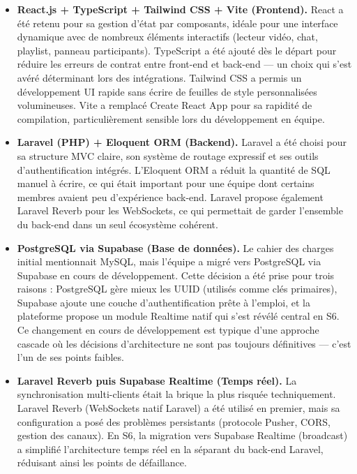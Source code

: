 \documentclass[11pt,a4paper]{report}
\begin{document}
\begin{itemize}
    \item \textbf{React.js + TypeScript + Tailwind CSS + Vite (Frontend).}
    React a été retenu pour sa gestion d'état par composants, idéale pour une interface dynamique avec de nombreux éléments interactifs (lecteur vidéo, chat, playlist, panneau participants). TypeScript a été ajouté dès le départ pour réduire les erreurs de contrat entre front-end et back-end --- un choix qui s'est avéré déterminant lors des intégrations. Tailwind CSS a permis un développement UI rapide sans écrire de feuilles de style personnalisées volumineuses. Vite a remplacé Create React App pour sa rapidité de compilation, particulièrement sensible lors du développement en équipe.

    \item \textbf{Laravel (PHP) + Eloquent ORM (Backend).}
    Laravel a été choisi pour sa structure MVC claire, son système de routage expressif et ses outils d'authentification intégrés. L'Eloquent ORM a réduit la quantité de SQL manuel à écrire, ce qui était important pour une équipe dont certains membres avaient peu d'expérience back-end. Laravel propose également Laravel Reverb pour les WebSockets, ce qui permettait de garder l'ensemble du back-end dans un seul écosystème cohérent.

    \item \textbf{PostgreSQL via Supabase (Base de données).}
    Le cahier des charges initial mentionnait MySQL, mais l'équipe a migré vers PostgreSQL via Supabase en cours de développement. Cette décision a été prise pour trois raisons : PostgreSQL gère mieux les UUID (utilisés comme clés primaires), Supabase ajoute une couche d'authentification prête à l'emploi, et la plateforme propose un module Realtime natif qui s'est révélé central en S6. Ce changement en cours de développement est typique d'une approche cascade où les décisions d'architecture ne sont pas toujours définitives --- c'est l'un de ses points faibles.

    \item \textbf{Laravel Reverb puis Supabase Realtime (Temps réel).}
    La synchronisation multi-clients était la brique la plus risquée techniquement. Laravel Reverb (WebSockets natif Laravel) a été utilisé en premier, mais sa configuration a posé des problèmes persistants (protocole Pusher, CORS, gestion des canaux). En S6, la migration vers Supabase Realtime (broadcast) a simplifié l'architecture temps réel en la séparant du back-end Laravel, réduisant ainsi les points de défaillance.


\end{itemize}
\end{document}
